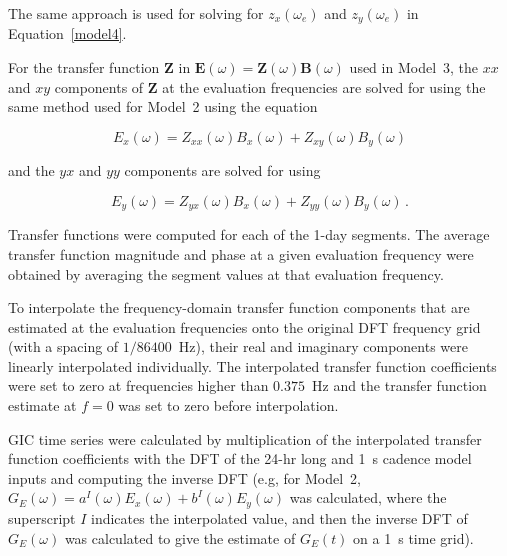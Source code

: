 \documentclass[draft,linenumbers]{agujournal2018}
\begin{document}
The same approach is used for solving for $z_x(\omega_e)$ and $z_y(\omega_e)$ in Equation~\ref{model4}.

For the transfer function $\boldsymbol{Z}$ in $\mathbf{E}(\omega) = \boldsymbol{Z}(\omega)\mathbf{B}(\omega)$ used in Model~3, the $xx$ and $xy$ components of $\boldsymbol{Z}$ at the evaluation frequencies are solved for using the same method used for Model~2 using the equation

\begin{linenomath*}
  \begin{equation*}
    E_x(\omega) = Z_{xx}(\omega)B_x(\omega) + Z_{xy}(\omega)B_{y}(\omega)
  \end{equation*}
\end{linenomath*}

\noindent
and the $yx$ and $yy$ components are solved for using

\begin{linenomath*}
  \begin{equation*}
    E_y(\omega) = Z_{yx}(\omega)B_x(\omega) + Z_{yy}(\omega)B_y(\omega)\,.
  \end{equation*}
\end{linenomath*}

Transfer functions were computed for each of the 1-day segments. The average transfer function magnitude and phase at a given evaluation frequency were obtained by averaging the segment values at that evaluation frequency.

To interpolate the frequency-domain transfer function components that are estimated at the evaluation frequencies onto the original DFT frequency grid (with a spacing of $1/86400$~Hz), their real and imaginary components were linearly interpolated individually. The interpolated transfer function coefficients were set to zero at frequencies higher than $0.375$~Hz and the transfer function estimate at $f=0$ was set to zero before interpolation.

GIC time series were calculated by multiplication of the interpolated transfer function coefficients with the DFT of the 24-hr long and 1~s cadence model inputs and computing the inverse DFT (e.g, for Model~2, $G_E(\omega)=a^I(\omega)E_x(\omega)+b^I(\omega)E_y(\omega)$ was calculated, where the superscript $I$ indicates the interpolated value, and then the inverse DFT of $G_E(\omega)$ was calculated to give the estimate of $G_E(t)$ on a 1~s time grid).
\end{document}
